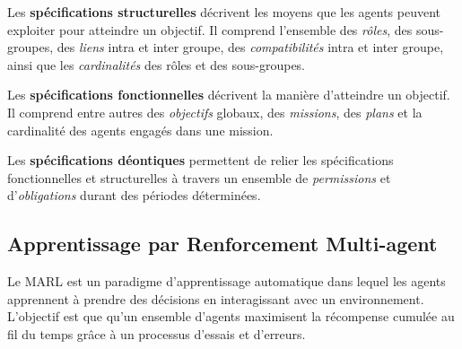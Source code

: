 \documentclass[demonstration]{jfsma}
\begin{document}
Les \textbf{spécifications structurelles} décrivent les moyens que les agents peuvent exploiter pour atteindre un objectif. Il comprend l'ensemble des \emph{rôles}, des sous-groupes, des \emph{liens} intra et inter groupe, des \emph{compatibilités} intra et inter groupe, ainsi que les \emph {cardinalités} des rôles et des sous-groupes.

Les \textbf{spécifications fonctionnelles} décrivent la manière d'atteindre un objectif. Il comprend entre autres des \emph{objectifs} globaux, des \emph{missions}, des \emph{plans} et la cardinalité des agents engagés dans une mission.

Les \textbf{spécifications déontiques} permettent de relier les spécifications fonctionnelles et structurelles à travers un ensemble de \emph{permissions} et d'\emph{obligations} durant des périodes déterminées.


\subsection{Apprentissage par Renforcement Multi-agent}

Le MARL est un paradigme d'apprentissage automatique dans lequel les agents apprennent à prendre des décisions en interagissant avec un environnement. L’objectif est que qu'un ensemble d'agents maximisent la récompense cumulée au fil du temps grâce à un processus d’essais et d’erreurs.
\end{document}
